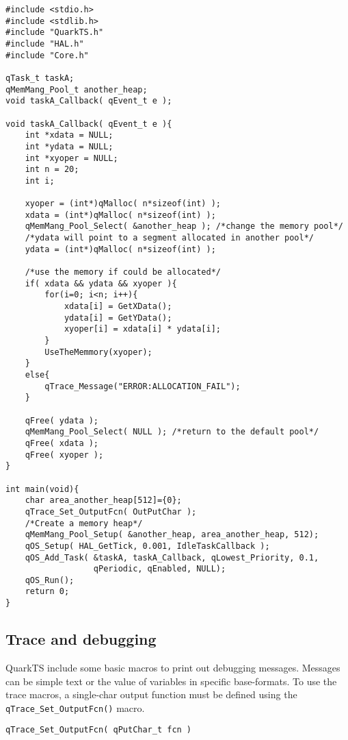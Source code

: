 \begin{lstlisting}[style=CStyle]
#include <stdio.h>
#include <stdlib.h>
#include "QuarkTS.h"
#include "HAL.h"
#include "Core.h"

qTask_t taskA;
qMemMang_Pool_t another_heap;
void taskA_Callback( qEvent_t e );

void taskA_Callback( qEvent_t e ){
    int *xdata = NULL;
    int *ydata = NULL;
    int *xyoper = NULL;
    int n = 20;
    int i;
    
    xyoper = (int*)qMalloc( n*sizeof(int) );
    xdata = (int*)qMalloc( n*sizeof(int) );
    qMemMang_Pool_Select( &another_heap ); /*change the memory pool*/
    /*ydata will point to a segment allocated in another pool*/
    ydata = (int*)qMalloc( n*sizeof(int) ); 
    
    /*use the memory if could be allocated*/
    if( xdata && ydata && xyoper ){ 
        for(i=0; i<n; i++){
            xdata[i] = GetXData();
            ydata[i] = GetYData();
            xyoper[i] = xdata[i] * ydata[i];
        }
        UseTheMemmory(xyoper);
    }
    else{
        qTrace_Message("ERROR:ALLOCATION_FAIL");
    }

    qFree( ydata );
    qMemMang_Pool_Select( NULL ); /*return to the default pool*/
    qFree( xdata );
    qFree( xyoper );
}

int main(void){
    char area_another_heap[512]={0};
    qTrace_Set_OutputFcn( OutPutChar );
    /*Create a memory heap*/
    qMemMang_Pool_Setup( &another_heap, area_another_heap, 512); 
    qOS_Setup( HAL_GetTick, 0.001, IdleTaskCallback );
    qOS_Add_Task( &taskA, taskA_Callback, qLowest_Priority, 0.1, 
                  qPeriodic, qEnabled, NULL);
    qOS_Run();
    return 0;
}

\end{lstlisting}  

\subsection{Trace and debugging}
QuarkTS include some basic macros to print out debugging messages. Messages can be simple text or the value of variables in specific base-formats. 
To use the trace macros, a single-char output function must be defined using the \lstinline{qTrace_Set_OutputFcn()} macro. \\

\begin{lstlisting}[style=CStyle]
qTrace_Set_OutputFcn( qPutChar_t fcn )
\end{lstlisting}

